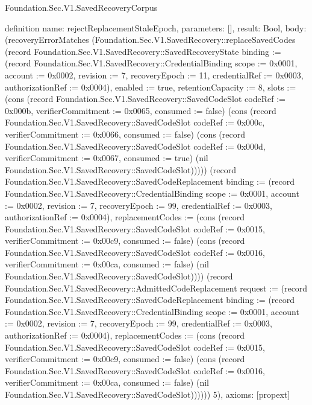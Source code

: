 \begin{lexlean}{Foundation.Sec.V1.SavedRecoveryCorpus}
\begin{semanticmodule}
definition{
  name: rejectReplacementStaleEpoch,
  parameters: [],
  result: Bool,
  body: (recoveryErrorMatches (Foundation.Sec.V1.SavedRecovery::replaceSavedCodes (record Foundation.Sec.V1.SavedRecovery::SavedRecoveryState {binding := (record Foundation.Sec.V1.SavedRecovery::CredentialBinding {scope := 0x0001, account := 0x0002, revision := 7, recoveryEpoch := 11, credentialRef := 0x0003, authorizationRef := 0x0004}), enabled := true, retentionCapacity := 8, slots := (cons (record Foundation.Sec.V1.SavedRecovery::SavedCodeSlot {codeRef := 0x000b, verifierCommitment := 0x0065, consumed := false}) (cons (record Foundation.Sec.V1.SavedRecovery::SavedCodeSlot {codeRef := 0x000c, verifierCommitment := 0x0066, consumed := false}) (cons (record Foundation.Sec.V1.SavedRecovery::SavedCodeSlot {codeRef := 0x000d, verifierCommitment := 0x0067, consumed := true}) (nil Foundation.Sec.V1.SavedRecovery::SavedCodeSlot))))}) (record Foundation.Sec.V1.SavedRecovery::SavedCodeReplacement {binding := (record Foundation.Sec.V1.SavedRecovery::CredentialBinding {scope := 0x0001, account := 0x0002, revision := 7, recoveryEpoch := 99, credentialRef := 0x0003, authorizationRef := 0x0004}), replacementCodes := (cons (record Foundation.Sec.V1.SavedRecovery::SavedCodeSlot {codeRef := 0x0015, verifierCommitment := 0x00c9, consumed := false}) (cons (record Foundation.Sec.V1.SavedRecovery::SavedCodeSlot {codeRef := 0x0016, verifierCommitment := 0x00ca, consumed := false}) (nil Foundation.Sec.V1.SavedRecovery::SavedCodeSlot)))}) (record Foundation.Sec.V1.SavedRecovery::AdmittedCodeReplacement {request := (record Foundation.Sec.V1.SavedRecovery::SavedCodeReplacement {binding := (record Foundation.Sec.V1.SavedRecovery::CredentialBinding {scope := 0x0001, account := 0x0002, revision := 7, recoveryEpoch := 99, credentialRef := 0x0003, authorizationRef := 0x0004}), replacementCodes := (cons (record Foundation.Sec.V1.SavedRecovery::SavedCodeSlot {codeRef := 0x0015, verifierCommitment := 0x00c9, consumed := false}) (cons (record Foundation.Sec.V1.SavedRecovery::SavedCodeSlot {codeRef := 0x0016, verifierCommitment := 0x00ca, consumed := false}) (nil Foundation.Sec.V1.SavedRecovery::SavedCodeSlot)))})})) 5),
  axioms: [propext]
}


\end{semanticmodule}
\end{lexlean}

